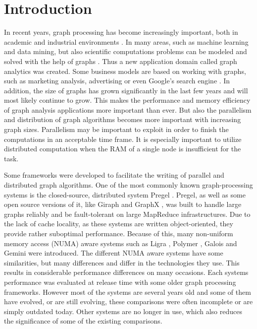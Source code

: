 \section{Introduction}
In recent years, graph processing has become increasingly important, both in academic and industrial environments \cite{Gemini}.
In many areas, such as machine learning and data mining, but also scientific computations problems can be modeled and solved with the help of graphs \cite{Polymer}.
Thus a new application domain called graph analytics was created.
Some business models are based on working with graphs, such as marketing analysis, advertising or even Google's search engine \cite{pagerank}.
In addition, the size of graphs has grown significantly in the last few years and will most likely continue to grow.
This makes the performance and memory efficiency of graph analysis applications more important than ever.
But also the parallelism and distribution of graph algorithms becomes more important with increasing graph sizes.
Parallelism may be important to exploit in order to finish the computations in an acceptable time frame.
It is especially important to utilize distributed computation when the RAM of a single node is insufficient for the task.

Some frameworks were developed to facilitate the writing of parallel and distributed graph algorithms.
One of the most commonly known graph-processing systems is the closed-source, distributed system Pregel \cite{pregel}.
Pregel, as well as some open source versions of it, like Giraph \cite{Giraph} and GraphX \cite{graphx}, was built to handle large graphs reliably and be fault-tolerant on large MapReduce infrastructures.
Due to the lack of cache locality, as these systems are written object-oriented, they provide rather suboptimal performance.
Because of this, many non-uniform memory access (NUMA) aware systems such as Ligra \cite{Ligra}, Polymer \cite{Polymer}, Galois \cite{Galois} and Gemini \cite{Gemini} were introduced.
The different NUMA aware systems have some similarities, but many differences and differ in the technologies they use.
This results in considerable performance differences on many occasions.
Each systems performance was evaluated at release time with some older graph processing frameworks.
However most of the systems are several years old and some of them have evolved, or are still evolving, these comparisons were often incomplete or are simply outdated today.
Other systems are no longer in use, which also reduces the significance of some of the existing comparisons.

